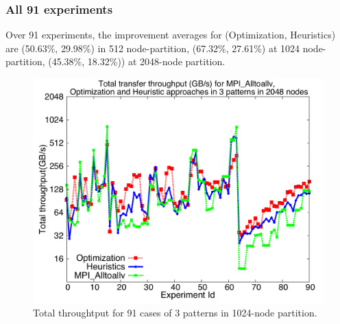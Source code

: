 \subsubsection{All 91 experiments}

Over 91 experiments, the improvement averages for (Optimization, Heuristics)  are (50.63\%, 29.98\%) in 512 node-partition, (67.32\%, 27.61\%) at 1024 node-partition, (45.38\%, 18.32\%)) at 2048-node partition.

\begin{figure}[!htb]
\vspace{-0.1in}
\centering
\includegraphics[scale=0.30]{figures/alltests_1k.pdf}
\vspace{-0.1in}
\caption{Total throughtput for 91 cases of 3 patterns in 1024-node partition.}
\vspace{-0.1in}
\label{fig:alltests_1k}
\end{figure}
